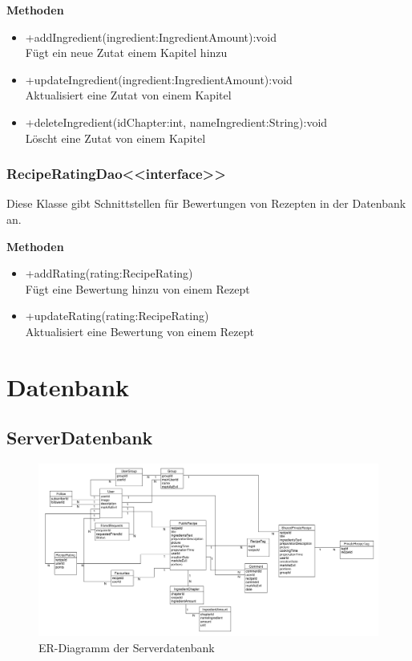 \textbf{Methoden}
\begin{itemize}
	\item +addIngredient(ingredient:IngredientAmount):void \\Fügt ein neue Zutat einem Kapitel hinzu
	\item +updateIngredient(ingredient:IngredientAmount):void \\Aktualisiert eine Zutat von einem Kapitel
	\item +deleteIngredient(idChapter:int, nameIngredient:String):void \\Löscht eine Zutat von einem Kapitel
\end{itemize}

\subsubsection{RecipeRatingDao<<interface>>}
Diese Klasse gibt Schnittstellen für Bewertungen von Rezepten in der Datenbank an.

\textbf{Methoden}
\begin{itemize}
	\item +addRating(rating:RecipeRating) \\Fügt eine Bewertung hinzu von einem Rezept
	\item +updateRating(rating:RecipeRating) \\Aktualisiert eine Bewertung von einem Rezept
\end{itemize}

\section{Datenbank}

\subsection{ServerDatenbank}

\begin{figure}
	\centering
	\includegraphics[width=1.0\textwidth]{pics/ServerDB.pdf}%
	\caption{ER-Diagramm der Serverdatenbank}%
\end{figure}

